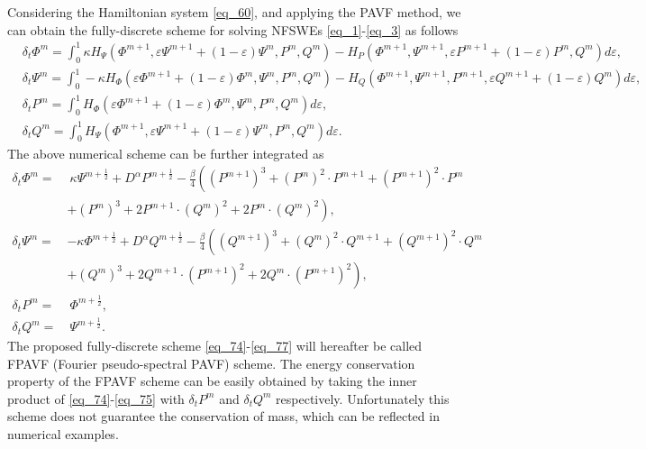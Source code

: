 \documentclass[preprint,compress,3p,10pt,fleqn]{elsarticle}
\numberwithin{equation}{section}
\begin{document}
Considering the Hamiltonian system \eqref{eq_60}, and applying the PAVF method, we can obtain the fully-discrete scheme for solving NFSWEs \eqref{eq_1}-\eqref{eq_3} as follows
\begin{align}
&\delta_{t} \varPhi^{m}\!\!=\!\!\int_{0}^{1}\!\!\kappa H_{\Psi}\!\!\left(\varPhi^{m+1}, \varepsilon \Psi^{m+1}\!\!+\!(1\!\!-\!\varepsilon) \Psi^{m}, P^{m}, Q^{m}\right)\!\!-\!\!H_{P}\!\!\left(\varPhi^{m+1}, \Psi^{m+1}, \varepsilon P^{m+1}\!\!+\!(1\!\!-\!\varepsilon) P^{m}, Q^{m}\right)\!d \varepsilon,\label{eq_70}\\
&\delta_{t} \Psi^{m}\!\!=\!\!\int_{0}^{1}\!\!\!\!-\kappa H_{\varPhi}\!\!\left(\varepsilon \varPhi^{m+1}\!\!+\!(1\!\!-\!\varepsilon) \varPhi^{m}, \Psi^{m}, P^{m}, Q^{m}\right)\!\!-\!\!H_{Q}\!\!\left(\varPhi^{m+1}, \Psi^{m+1}, P^{m+1}, \varepsilon Q^{m+1}\!\!+\!(1\!\!-\!\varepsilon) Q^{m}\right)\!d\varepsilon,\label{eq_71}\\
&\delta_{t} P^{m}\!=\!\int_{0}^{1}\!H_{\varPhi}\left(\varepsilon \varPhi^{m+1}\!+\!(1\!-\!\varepsilon) \varPhi^{m}, \Psi^{m}, P^{m}, Q^{m}\right) d \varepsilon,\label{eq_72}\\
&\delta_{t} Q^{m}\!=\!\int_{0}^{1}\!H_{\Psi}\left(\varPhi^{m+1}, \varepsilon \Psi^{m+1}\!+\!(1\!-\!\varepsilon) \Psi^{m}, P^{m}, Q^{m}\right) d \varepsilon.\label{eq_73}
\end{align}
The above numerical scheme can be further integrated as
\begin{align}
\delta_{t} \varPhi^{m}=&~\kappa \Psi^{m+\frac{1}{2}}+D^{\alpha} P^{m+\frac{1}{2}}-\frac{\beta}{4}\left( (P^{m+1})^3+ (P^{m})^{2}\cdot P^{m+1}+(P^{m+1})^{2}\cdot P^{m}\right.\nonumber\\
	&+\left. (P^{m})^{3}+2 P^{m+1}\cdot (Q^{m})^{2}+2 P^{m}\cdot (Q^{m})^{2}\right),\label{eq_74}\\
\delta_{t} \Psi^{m}=&-\kappa \varPhi^{m+\frac{1}{2}}+D^{\alpha} Q^{m+\frac{1}{2}}-\frac{\beta}{4}\left( (Q^{m+1})^3+ (Q^{m})^{2}\cdot Q^{m+1}+(Q^{m+1})^{2}\cdot Q^{m}\right.\nonumber\\
	&+\left. (Q^{m})^{3}+2 Q^{m+1}\cdot (P^{m+1})^{2}+2 Q^{m}\cdot (P^{m+1})^{2}\right),\label{eq_75}\\
\delta_{t} P^{m}=&~\varPhi^{m+\frac{1}{2}},\label{eq_76}\\
\delta_{t} Q^{m}=&~\Psi^{m+\frac{1}{2}}.\label{eq_77}
\end{align}
The proposed fully-discrete scheme \eqref{eq_74}-\eqref{eq_77} will hereafter be called FPAVF (Fourier pseudo-spectral PAVF) scheme. The energy conservation property of the FPAVF scheme can be easily obtained by taking the inner product of \eqref{eq_74}-\eqref{eq_75} with $\delta_t P^{m}$ and $\delta_t Q^{m}$ respectively. Unfortunately this scheme does not guarantee the conservation of mass, which can be reflected in numerical examples.
\end{document}
